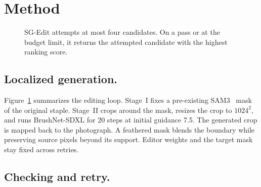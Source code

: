 \section{Method}

\begin{figure}[t]
\centering
{}
\caption{SG-Edit attempts at most four candidates. On a pass or at the budget limit, it returns the attempted candidate with the highest ranking score.}\label{fig:system}
\end{figure}

\subsection{Localized generation.}

Figure~\ref{fig:system} summarizes the editing loop. Stage~I fixes a pre-existing SAM3~\cite{carion2026sam3} mask of the original staple. Stage~II crops around the mask, resizes the crop to $1024^2$, and runs BrushNet-SDXL for 20 steps at initial guidance 7.5. The generated crop is mapped back to the photograph. A feathered mask blends the boundary while preserving source pixels beyond its support. Editor weights and the target mask stay fixed across retries.

\subsection{Checking and retry.}

